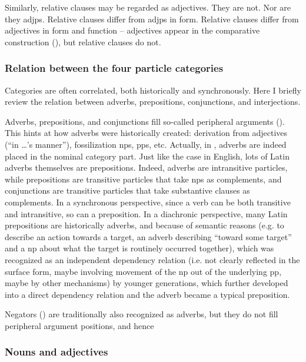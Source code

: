 \documentclass{article}
\begin{document}
Similarly, relative clauses may be regarded as adjectives.
They are not. Nor are they \ac{adjp}s.
Relative clauses differ from \ac{adjp}s in form.
Relative clauses differ from adjectives in form and function 
-- adjectives appear in the comparative construction (),
but relative clauses do not.

\subsubsection{Relation between the four particle categories}\label{sec:particle-relation}

Categories are often correlated, both historically and synchronously.
Here I briefly review the relation between adverbs, prepositions, conjunctions, and interjections. %

Adverbs, prepositions, and conjunctions fill so-called peripheral arguments ().
This hints at how adverbs were historically created:
derivation from adjectives (``in \dots's manner''), 
fossilization \ac{np}s, \ac{pp}s, etc.
Actually, in \citet{forker2020grammar}, adverbs are indeed placed in the nominal category part.
Just like the case in English, 
lots of Latin adverbs themselves are prepositions.
Indeed, adverbs are intransitive particles,
while prepositions are transitive particles that take \ac{np}s as complements,
and conjunctions are transitive particles that take substantive clauses as complements.
In a synchronous perspective, since a verb can be both transitive and intransitive,
so can a preposition.
In a diachronic perspective, many Latin prepositions are historically adverbs, 
and because of semantic reasons (e.g. to describe an action towards a target,
an adverb describing ``toward some target'' and a \ac{np} about what the target is routinely occurred together),
which was recognized as an independent dependency relation 
(i.e. not clearly reflected in the surface form,
maybe involving movement of the \ac{np} out of the underlying \ac{pp},
maybe by other mechanisms) 
by younger generations,
which further developed into a direct dependency relation
and the adverb became a typical preposition.

Negators () are traditionally also recognized as adverbs, 
but they do not fill peripheral argument positions,
and hence %


\subsubsection{Nouns and adjectives}
\end{document}
